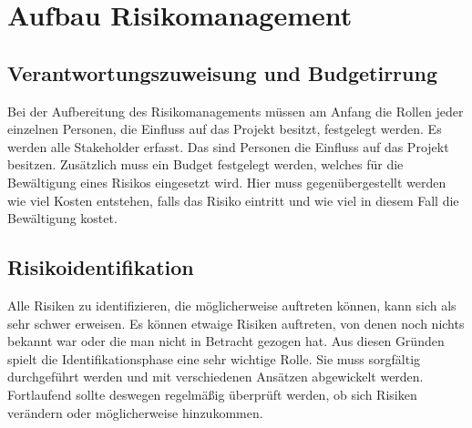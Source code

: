 \section{Aufbau Risikomanagement}
\subsection{Verantwortungszuweisung und Budgetirrung}
Bei der Aufbereitung des Risikomanagements müssen am Anfang die Rollen jeder einzelnen Personen, die Einfluss auf das Projekt besitzt, festgelegt werden. Es werden alle Stakeholder erfasst. Das sind Personen die Einfluss auf das Projekt besitzen.
Zusätzlich muss ein Budget festgelegt werden, welches für die Bewältigung eines Risikos eingesetzt wird. Hier muss gegenübergestellt werden wie viel Kosten entstehen, falls das Risiko eintritt und wie viel in diesem Fall die Bewältigung kostet.

\subsection{Risikoidentifikation}
Alle Risiken zu identifizieren, die möglicherweise auftreten können, kann sich als sehr schwer erweisen. Es können etwaige Risiken auftreten, von denen noch nichts bekannt war oder die man nicht in Betracht gezogen hat. Aus diesen Gründen spielt die Identifikationsphase eine sehr wichtige Rolle. Sie muss sorgfältig durchgeführt werden und mit verschiedenen Ansätzen abgewickelt werden. Fortlaufend sollte deswegen regelmäßig überprüft werden, ob sich Risiken verändern oder möglicherweise hinzukommen.
\\

